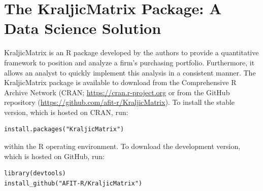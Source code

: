 \documentclass[twocolumn]{svjour3}       %
\begin{document}
\section{The KraljicMatrix Package: A Data Science Solution}
\label{sec:4}

KraljicMatrix \citep{bmof17} is an R package developed by the authors to provide a quantitative framework to position and analyze a firm's purchasing portfolio. Furthermore, it allows an analyst to quickly implement this analysis in a consistent manner. The KraljicMatrix package is available to download from the Comprehensive R Archive Network (CRAN; \url{https://cran.r-project.org} or from the GitHub repository (\url{https://github.com/afit-r/KraljicMatrix}). To install the stable version, which is hosted on CRAN, run:
\begin{verbatim}
install.packages("KraljicMatrix")
\end{verbatim}
within the R operating environment. To download the development version, which is hosted on GitHub, run:
\begin{verbatim}
library(devtools)
install_github("AFIT-R/KraljicMatrix")
\end{verbatim}
\end{document}

